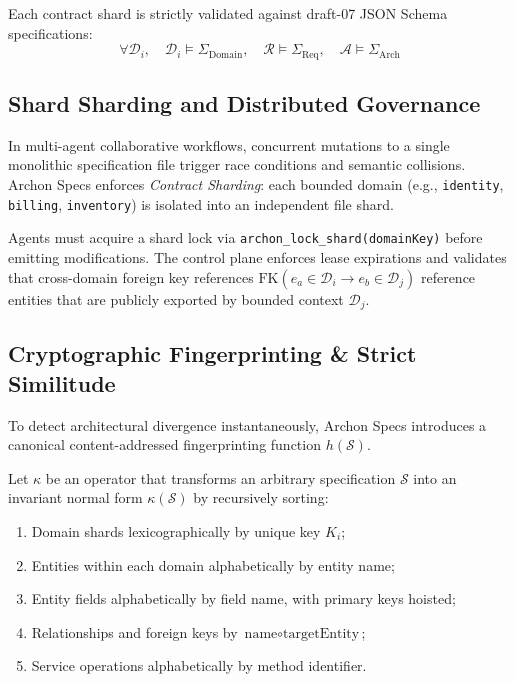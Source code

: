 Each contract shard is strictly validated against draft-07 JSON Schema specifications:
\begin{equation}
  \forall \mathcal{D}_i, \quad \mathcal{D}_i \models \Sigma_{\text{Domain}}, \quad \mathcal{R} \models \Sigma_{\text{Req}}, \quad \mathcal{A} \models \Sigma_{\text{Arch}}
\end{equation}

\subsection{Shard Sharding and Distributed Governance}
In multi-agent collaborative workflows, concurrent mutations to a single monolithic specification file trigger race conditions and semantic collisions. Archon Specs enforces \emph{Contract Sharding}: each bounded domain (e.g., \texttt{identity}, \texttt{billing}, \texttt{inventory}) is isolated into an independent file shard. 

Agents must acquire a shard lock via \texttt{archon\_lock\_shard(domainKey)} before emitting modifications. The control plane enforces lease expirations and validates that cross-domain foreign key references $\text{FK}(e_a \in \mathcal{D}_i \to e_b \in \mathcal{D}_j)$ reference entities that are publicly exported by bounded context $\mathcal{D}_j$.

\subsection{Cryptographic Fingerprinting \& Strict Similitude}
To detect architectural divergence instantaneously, Archon Specs introduces a canonical content-addressed fingerprinting function $h(\mathcal{S})$.

\begin{definition}
Let $\kappa$ be an operator that transforms an arbitrary specification $\mathcal{S}$ into an invariant normal form $\kappa(\mathcal{S})$ by recursively sorting:
\begin{enumerate}[leftmargin=*]
  \item Domain shards lexicographically by unique key $K_i$;
  \item Entities within each domain alphabetically by entity name;
  \item Entity fields alphabetically by field name, with primary keys hoisted;
  \item Relationships and foreign keys by $\text{name} \circ \text{targetEntity}$;
  \item Service operations alphabetically by method identifier.
\end{enumerate}
\end{definition}

